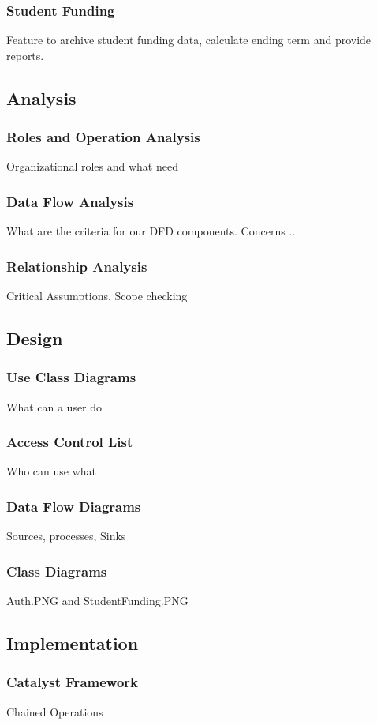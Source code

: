 \documentclass{journal}
\begin{document}
\subsubsection{Student Funding}
Feature to archive student funding data, calculate ending term and provide reports.
\subsection{Analysis}
\subsubsection{Roles and Operation Analysis}
Organizational roles and what need 
\subsubsection{Data Flow Analysis}
What are the criteria for our DFD components. Concerns .. 
\subsubsection{Relationship Analysis}
Critical Assumptions, Scope checking
\subsection{Design}
\subsubsection{Use Class Diagrams}
What can a user do
\subsubsection{Access Control List}
Who can use what
\subsubsection{Data Flow Diagrams}
Sources, processes, Sinks
\subsubsection{Class Diagrams}
Auth.PNG and StudentFunding.PNG
\subsection{Implementation}
\subsubsection{Catalyst Framework}
Chained Operations
\end{document}
